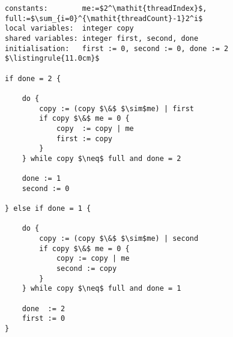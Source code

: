 \begin{center}
\begin{minipage}{\textwidth}
\begin{lstlisting}[mathescape, linewidth=11.0cm]
constants:        me:=$2^\mathit{threadIndex}$, full:=$\sum_{i=0}^{\mathit{threadCount}-1}2^i$
local variables:  integer copy
shared variables: integer first, second, done
initialisation:   first := 0, second := 0, done := 2
$\listingrule{11.0cm}$

if done = 2 {

	do {
		copy := (copy $\&$ $\sim$me) | first
		if copy $\&$ me = 0 {
			copy  := copy | me
			first := copy
		}
	} while copy $\neq$ full and done = 2

	done := 1
	second := 0

} else if done = 1 {

	do {
		copy := (copy $\&$ $\sim$me) | second
		if copy $\&$ me = 0 {
			copy := copy | me
			second := copy
		}
	} while copy $\neq$ full and done = 1

	done  := 2
	first := 0
}
\end{lstlisting}
\end{minipage}
\end{center}
